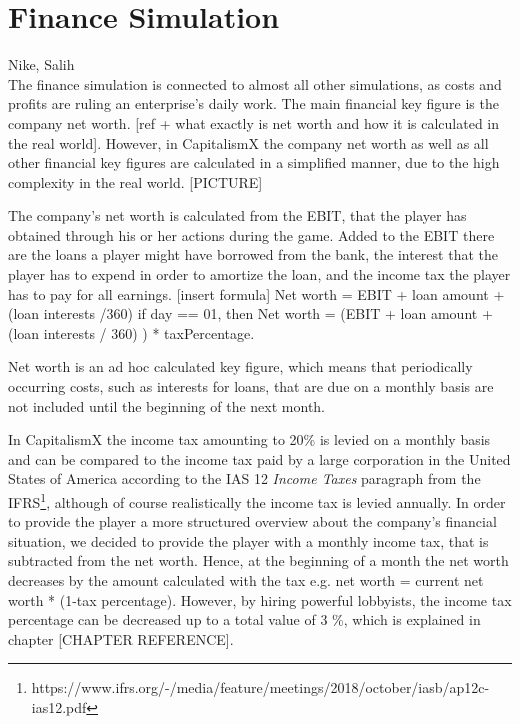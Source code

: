 \section{Finance Simulation}
\label{sec:diag}
Nike, Salih\\
The finance simulation is connected to almost all other simulations, as costs and profits are ruling an enterprise's daily work. The main financial key figure is the company net worth. [ref + what exactly is net worth and how it is calculated in the real world]. However, in CapitalismX the company net worth as well as all other financial key figures are calculated in a simplified manner, due to the high complexity in the real world. 
[PICTURE]

The company’s net worth is calculated from the EBIT, that the player has obtained through his or her actions during the game. Added to the EBIT there are the loans a player might have borrowed from the bank, the interest that the player has to expend in order to amortize the loan, and the income tax the player has to pay for all earnings. [insert formula]
Net worth = EBIT + loan amount + (loan interests /360) if day == 01, then Net worth = (EBIT + loan amount + (loan interests / 360) ) * taxPercentage.

Net worth is an ad hoc calculated key figure, which means that periodically occurring costs, such as interests for loans, that are due on a monthly basis are not included until the beginning of the next month. 

In CapitalismX the income tax amounting to 20\% is levied on a monthly basis and can be compared to the income tax paid by a large corporation in the United States of America according to the IAS 12 \textit{Income Taxes} paragraph from the IFRS\footnote{https://www.ifrs.org/-/media/feature/meetings/2018/october/iasb/ap12c-ias12.pdf}, although of course realistically the income tax is levied annually. In order to provide the player a more structured overview about the company’s financial situation, we decided to provide the player with a monthly income tax, that is subtracted from the net worth. Hence, at the beginning of a month the net worth decreases by the amount calculated with the tax e.g. net worth = current net worth * (1-tax percentage). However, by hiring powerful lobbyists, the income tax percentage can be decreased up to a total value of 3 \%, which is explained in chapter [CHAPTER REFERENCE].

